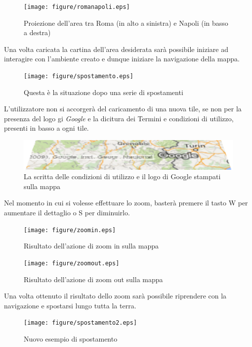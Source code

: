 \begin{figure}[H]
	\centering
	\texttt{[image: figure/romanapoli.eps]}
	\caption{Proiezione dell'area tra Roma (in alto a sinistra) e Napoli (in basso a destra)}
\end{figure}

Una volta caricata la cartina dell'area desiderata sarà possibile iniziare ad interagire con l'ambiente creato e dunque iniziare la navigazione della mappa.

\begin{figure}[H]
	\centering
	\texttt{[image: figure/spostamento.eps]}
	\caption{Questa è la situazione dopo una serie di spostamenti}
\end{figure}

L'utilizzatore non si accorgerà del caricamento di una nuova tile, se non per la presenza del logo gi \textit{Google} e la dicitura dei Termini e condizioni di utilizzo, presenti in basso a ogni tile.

\begin{figure}[H]
	\centering
	\includegraphics[width=\textwidth]{figure/terminiecondizioni.eps}
	\caption{La scritta delle condizioni di utilizzo e il logo di Google stampati sulla mappa}
\end{figure}

Nel momento in cui si volesse effettuare lo zoom, basterà premere il tasto W per aumentare il dettaglio o S per diminuirlo.

\begin{figure}[H]
	\centering
	\texttt{[image: figure/zoomin.eps]}
	\caption{Risultato dell'azione di zoom in sulla mappa}
\end{figure}

\begin{figure}[H]
	\centering
	\texttt{[image: figure/zoomout.eps]}
	\caption{Risultato dell'azione di zoom out sulla mappa}
\end{figure}

Una volta ottenuto il risultato dello zoom sarà possibile riprendere con la navigazione e spostarsi lungo tutta la terra.

\begin{figure}[H]
	\centering
	\texttt{[image: figure/spostamento2.eps]}
	\caption{Nuovo esempio di spostamento}
\end{figure}